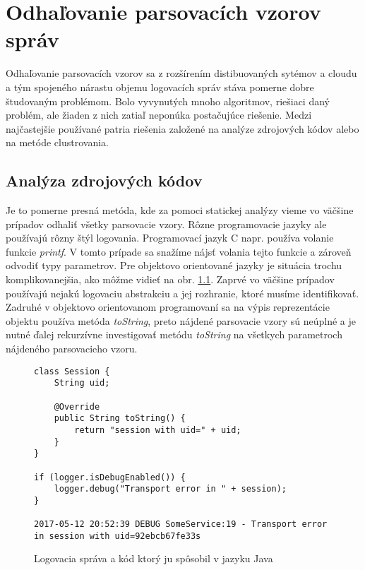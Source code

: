 \chapter{Odhaľovanie parsovacích vzorov správ}

Odhaľovanie parsovacích vzorov sa z rozšírením distibuovaných sytémov a cloudu a tým spojeného nárastu objemu logovacích správ stáva pomerne dobre študovaným problémom. Bolo vyvynutých mnoho algoritmov, riešiaci daný problém, ale žiaden z nich zatiaľ neponúka postačujúce riešenie. Medzi najčastejšie používané patria riešenia založené na analýze zdrojových kódov alebo na metóde clustrovania.

\section{Analýza zdrojových kódov}

Je to pomerne presná metóda, kde za pomoci statickej analýzy vieme vo väčšine prípadov odhaliť všetky parsovacie vzory.
Rôzne programovacie jazyky ale používajú rôzny štýl logovania. Programovací jazyk C napr. používa volanie funkcie \emph{printf}.
V tomto prípade sa snažíme nájsť volania tejto funkcie a zároveň odvodiť typy parametrov.
Pre objektovo orientované jazyky je situácia trochu komplikovanejšia, ako môžme vidieť na obr. \ref{fig:static-analysis}. Zaprvé vo väčšine prípadov používajú nejakú logovaciu abstrakciu a jej rozhranie, ktoré musíme identifikovať. Zadruhé v objektovo orientovanom programovaní sa na výpis reprezentácie objektu používa metóda \emph{toString}, preto nájdené parsovacie vzory sú neúplné a je nutné ďalej rekurzívne investigovať metódu \emph{toString} na všetkych parametroch nájdeného parsovacieho vzoru.

\begin{figure}[htbp]
\centering
\begin{minipage}{0.9\textwidth}
\lstset{tabsize=4,columns=flexible,breaklines=true,breakatwhitespace=true, showstringspaces=false}
\begin{lstlisting}
class Session {
	String uid;
	
	@Override
	public String toString() {
		return "session with uid=" + uid;
	}
}

if (logger.isDebugEnabled()) {
	logger.debug("Transport error in " + session);
}

2017-05-12 20:52:39 DEBUG SomeService:19 - Transport error in session with uid=92ebcb67fe33s
\end{lstlisting} 		
\end{minipage} 
\caption{Logovacia správa a kód ktorý ju spôsobil v jazyku Java}
\label{fig:static-analysis}
\end{figure}

